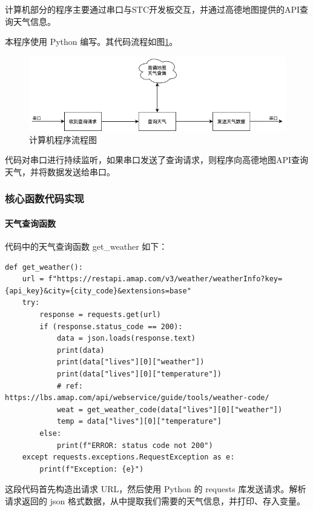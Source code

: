 \documentclass{article}
\begin{document}
计算机部分的程序主要通过串口与STC开发板交互，并通过高德地图提供的API查询天气信息。

本程序使用 Python 编写。其代码流程如图\ref{fig:pc_flow}。

\begin{figure}[h]
    \centering
    \includegraphics[width=1\textwidth]{pc_flow}
    \caption{计算机程序流程图}
    \label{fig:pc_flow}
\end{figure}

代码对串口进行持续监听，如果串口发送了查询请求，则程序向高德地图API查询天气，并将数据发送给串口。

\subsubsection{核心函数代码实现}

\paragraph{天气查询函数}

代码中的天气查询函数 get\_weather 如下：

\begin{verbatim}
def get_weather():
    url = f"https://restapi.amap.com/v3/weather/weatherInfo?key={api_key}&city={city_code}&extensions=base"
    try:
        response = requests.get(url)
        if (response.status_code == 200):
            data = json.loads(response.text)
            print(data)
            print(data["lives"][0]["weather"])
            print(data["lives"][0]["temperature"])
            # ref: https://lbs.amap.com/api/webservice/guide/tools/weather-code/
            weat = get_weather_code(data["lives"][0]["weather"])
            temp = data["lives"][0]["temperature"]
        else:
            print(f"ERROR: status code not 200")
    except requests.exceptions.RequestException as e:
        print(f"Exception: {e}")
\end{verbatim}

这段代码首先构造出请求 URL，然后使用 Python 的 requests 库发送请求。解析请求返回的 json 格式数据，从中提取我们需要的天气信息，并打印、存入变量。
\end{document}
